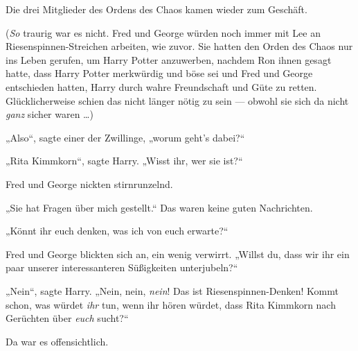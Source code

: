 Die drei Mitglieder des Ordens des Chaos kamen wieder zum Geschäft.

(\emph{So} traurig war es nicht. Fred und George würden noch immer mit Lee an Riesenspinnen-Streichen arbeiten, wie zuvor. Sie hatten den Orden des Chaos nur ins Leben gerufen, um Harry Potter anzuwerben, nachdem Ron ihnen gesagt hatte, dass Harry Potter merkwürdig und böse sei und Fred und George entschieden hatten, Harry durch wahre Freundschaft und Güte zu retten. Glücklicherweise schien das nicht länger nötig zu sein — obwohl sie sich da nicht \emph{ganz} sicher waren …)

„Also“, sagte einer der Zwillinge, „worum geht’s dabei?“

„Rita Kimmkorn“, sagte Harry.
„Wisst ihr, wer sie ist?“

Fred und George nickten stirnrunzelnd.

„Sie hat Fragen über mich gestellt.“
Das waren keine guten Nachrichten.

„Könnt ihr euch denken, was ich von euch erwarte?“

Fred und George blickten sich an, ein wenig verwirrt.
„Willst du, dass wir ihr ein paar unserer interessanteren Süßigkeiten unterjubeln?“

„Nein“, sagte Harry.
„Nein, nein, \emph{nein}! Das ist Riesenspinnen-Denken! Kommt schon, was würdet \emph{ihr} tun, wenn ihr hören würdet, dass Rita Kimmkorn nach Gerüchten über \emph{euch} sucht?“

Da war es offensichtlich.

